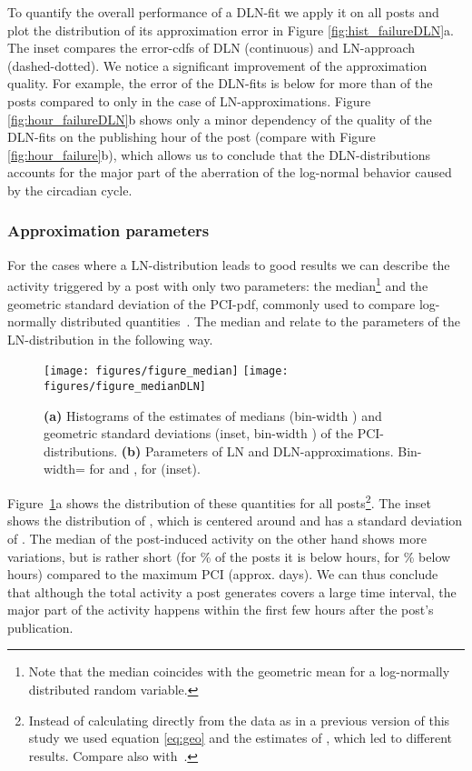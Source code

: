 \documentclass[twoside,11pt]{article}
\begin{document}
To quantify the overall performance of a DLN-fit we apply it on all
posts and plot the distribution of its approximation error 
in Figure \ref{fig:hist_failureDLN}a. The inset compares the
error-cdfs of DLN (continuous) and LN-approach (dashed-dotted). We
notice a significant improvement of the approximation quality. For
example, the error of the DLN-fits is below  for more than
 of the posts compared to only  in the case of
LN-approximations.  Figure \ref{fig:hour_failureDLN}b shows only a
minor dependency of the quality of the DLN-fits on the publishing hour
of the post (compare with Figure \ref{fig:hour_failure}b), which
allows us to conclude that the DLN-distributions accounts for the
major part of the aberration of the log-normal behavior caused by the
circadian cycle.

\subsubsection{Approximation parameters}\noindent
For the cases where a LN-distribution leads to good results we can
describe the activity triggered by a post with only two parameters:
the median\footnote{Note that the median coincides with the geometric
  mean for a log-normally distributed random variable.}  and the
geometric standard deviation  of the PCI-pdf, commonly used
to compare log-normally distributed quantities~\citep{LimpertSA01}.
The median and  relate to the parameters of the
LN-distribution in the following way.


\begin{figure}[!htb]\centering
  \texttt{[image: figures/figure\_median]}
  \texttt{[image: figures/figure\_medianDLN]}
  \caption{\textbf{(a)} Histograms of the estimates of medians
    (bin-width ) and geometric standard deviations (inset,
    bin-width ) of the PCI-distributions.  \textbf{(b)}
    Parameters of LN and DLN-approximations.  Bin-width= for
     and ,  for  (inset).  }
\label{fig:hist_median}
\end{figure}

Figure~\ref{fig:hist_median}a shows the distribution of these
quantities for all posts\footnote{Instead of calculating 
  directly from the data as in a previous version of this study
  \citep{kaltenbrunner_saw2007} we used equation \eqref{eq:geo} and the
  estimates of , which led to different results. Compare also
  with~\citet{LimpertSA01}.}.  The inset shows the distribution of
, which is centered around  and has a standard
deviation of . The median of the post-induced activity on the
other hand shows more variations, but is rather short (for \% of
the posts it is below  hours, for \% below  hours)
compared to the maximum PCI (approx.  days). We can thus conclude
that although the total activity a post generates covers a large time
interval, the major part of the activity happens within the first few
hours after the post's publication.
\end{document}
